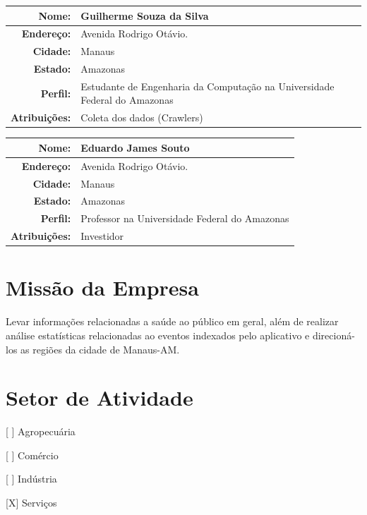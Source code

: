 \documentclass[
	12pt,				%
	openright,			%
	twoside,			%
	a4paper,			%
	english,			%
	french,				%
	spanish,			%
	brazil,				%
	]{abntex2}
\begin{document}
\begin{center}
	\begin{tabular}{|r|p{12cm}|}
		\hline
		\textbf{Nome:}		& Guilherme Souza da Silva \\ \hline
		\textbf{Endereço:}	& Avenida Rodrigo Otávio. \\ \hline
		\textbf{Cidade:}	& Manaus \\ \hline
		\textbf{Estado:}	& Amazonas \\ \hline
		\textbf{Perfil:}	& Estudante de Engenharia da Computação na Universidade Federal do Amazonas\\ \hline
		\textbf{Atribuições:}	& Coleta dos dados (Crawlers) \\ \hline
	\end{tabular}
\end{center}

\begin{center}
	\begin{tabular}{|r|p{12cm}|}
		\hline
		\textbf{Nome:}		& Eduardo James Souto \\ \hline
		\textbf{Endereço:}	& Avenida Rodrigo Otávio. \\ \hline
		\textbf{Cidade:}	& Manaus \\ \hline
		\textbf{Estado:}	& Amazonas \\ \hline
		\textbf{Perfil:}	& Professor na Universidade Federal do Amazonas \\ \hline
		\textbf{Atribuições:}	& Investidor \\ \hline
	\end{tabular}
\end{center}

\section{Missão da Empresa}

Levar informações relacionadas a saúde ao público em geral, além de realizar análise estatísticas relacionadas ao eventos indexados pelo aplicativo e direcioná-los as regiões da cidade de Manaus-AM.

\section{Setor de Atividade}

[ ] Agropecuária

[ ] Comércio

[ ] Indústria

[X] Serviços
\end{document}
